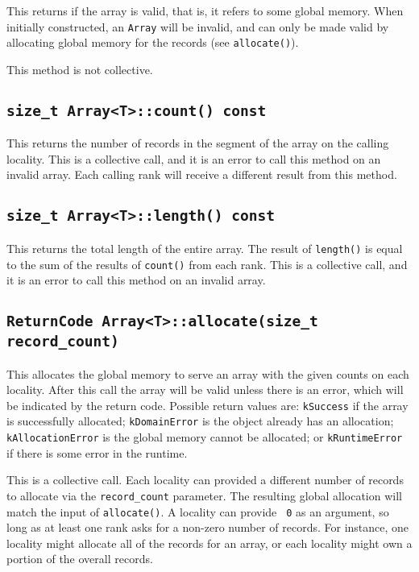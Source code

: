 This returns if the array is valid, that is, it refers to some global memory.
When initially constructed, an {\tt Array} will be invalid, and can only be made
valid by allocating global memory for the records (see {\tt allocate()}).

This method is not collective.

\subsection{{\tt size\_t Array<T>::count() const}}

This returns the number of records in the segment of the array on the calling
locality. This is a collective call, and it is an error to call this method
on an invalid array. Each calling rank will receive a different result from
this method.

\subsection{{\tt size\_t Array<T>::length() const}}

This returns the total length of the entire array. The result of {\tt length()}
is equal to the sum of the results of {\tt count()} from each rank. This is a
collective call, and it is an error to call this method on an invalid array.

\subsection{{\tt ReturnCode Array<T>::allocate(size\_t record\_count)}}

This allocates the global memory to serve an array with the given counts on
each locality. After this call the array will be valid unless there is an
error, which will be indicated by the return code. Possible return values are:
{\tt kSuccess} if the array is successfully allocated; {\tt kDomainError} is the
object already has an allocation; {\tt kAllocationError} is the global memory
cannot be allocated; or {\tt kRuntimeError} if there is some error in the
runtime.

This is a collective call. Each locality can provided a different number of
records to allocate via the {\tt record\_count} parameter. The resulting global
allocation will match the input of {\tt allocate()}. A locality can provide {\tt
  0} as an argument, so long as at least one rank asks for a non-zero number of
records. For instance, one locality might allocate all of the records for
an array, or each locality might own a portion of the overall records.

